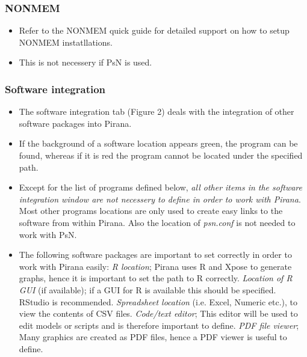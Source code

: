 \subsubsection*{NONMEM}
\begin{itemize}
\item Refer to the NONMEM quick guide for detailed support on how to setup NONMEM instatllations. 
\item This is not necessery if PsN is used. 
\end{itemize}

\subsubsection*{Software integration}
\begin{itemize}
\item The software integration tab (Figure 2) deals with the integration of other software packages into Pirana. 
\item If the background of a software location appears green, the program can be found, whereas if it is red the program cannot be located under the specified path.
  \item Except for the list of programs defined below,  \emph{all other items in the software integration window are not necessery to define in order to work with Pirana}. Most other programs locations are only used to create easy links to the software from within Pirana. Also the location of \emph{psn.conf} is not needed to work with PsN.
 \item The following software packages are important to set correctly in order to work with Pirana easily: 
 \subitem \emph{R location}; Pirana uses R and Xpose to generate graphs, hence it is important to set the path to R correctly.
 \subitem \emph{Location of R GUI} (if available); if a GUI for R is available this should be specified. RStudio is recommended.
 \subitem\emph{ Spreadsheet location} (i.e. Excel, Numeric etc.), to view the contents of CSV files.
 \subitem\emph{ Code/text editor}; This editor will be used to edit models or scripts and is therefore important to define. 
 \subitem\emph{ PDF file viewer}; Many graphics are created as PDF files, hence a PDF viewer is useful to define.
\end{itemize}
